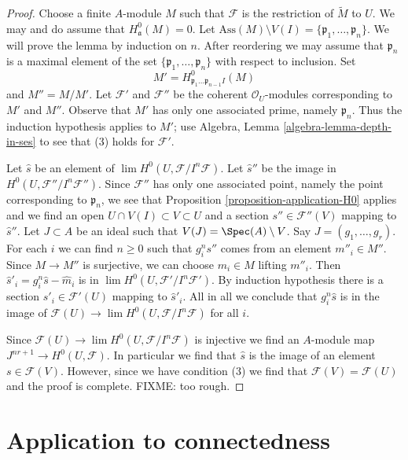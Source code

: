 \begin{proof}
Choose a finite $A$-module $M$ such that $\mathcal{F}$ is the restriction
of $\widetilde{M}$ to $U$. We may and do assume that $H^0_\mathfrak a(M) = 0$.
Let $\text{Ass}(M) \setminus V(I) = \{\mathfrak p_1, \ldots, \mathfrak p_n\}$.
We will prove the lemma by induction on $n$. After reordering we
may assume that $\mathfrak p_n$ is a maximal element of the set
$\{\mathfrak p_1, \ldots, \mathfrak p_n\}$ with respect to inclusion.
Set
$$
M' = H^0_{\mathfrak p_1 \ldots \mathfrak p_{n - 1} I}(M)
$$
and $M'' = M/M'$. Let $\mathcal{F}'$ and $\mathcal{F}''$ be the
coherent $\mathcal{O}_U$-modules corresponding to $M'$ and $M''$.
Observe that $M'$ has only one associated prime, namely $\mathfrak p_n$.
Thus the induction hypothesis applies to $M'$;
use Algebra, Lemma \ref{algebra-lemma-depth-in-ses}
to see that (3) holds for $\mathcal{F}'$.

\medskip\noindent
Let $\hat s$ be an element of $\lim H^0(U, \mathcal{F}/I^n\mathcal{F})$.
Let $\hat s''$ be the image in $H^0(U, \mathcal{F}''/I^n\mathcal{F}'')$.
Since $\mathcal{F}''$ has only one associated point, namely the point
corresponding to $\mathfrak p_n$, we see that
Proposition \ref{proposition-application-H0} applies and we find an open
$U \cap V(I) \subset V \subset U$
and a section $s'' \in \mathcal{F}''(V)$ mapping to $\hat s''$.
Let $J \subset A$ be an ideal such that $V(J) = \Spec(A) \setminus V$.
Say $J = (g_1, \ldots, g_r)$.
For each $i$ we can find $n \geq 0$ such that $g_i^n s''$ comes
from an element $m''_i \in M''$.
Since $M \to M''$ is surjective, we can choose $m_i \in M$
lifting $m''_i$. Then $\hat s'_i = g_i^n \hat s - \hat m_i$ is in
$\lim H^0(U, \mathcal{F}'/I^n\mathcal{F}')$.
By induction hypothesis there is a section $s'_i \in \mathcal{F}'(U)$
mapping to $\hat s'_i$.
All in all we conclude that $g_i^n \hat s$ is in the image
of $\mathcal{F}(U) \to \lim H^0(U, \mathcal{F}/I^n\mathcal{F})$
for all $i$.

\medskip\noindent
Since $\mathcal{F}(U) \to \lim H^0(U, \mathcal{F}/I^n\mathcal{F})$
is injective we find an $A$-module map $J^{nr + 1} \to H^0(U, \mathcal{F})$.
In particular we find that $\hat s$ is the image of an element
$s \in \mathcal{F}(V)$. However, since we have condition (3) we find
that $\mathcal{F}(V) = \mathcal{F}(U)$ and the proof is complete.
FIXME: too rough.
\end{proof}





\section{Application to connectedness}
\label{section-connected}

